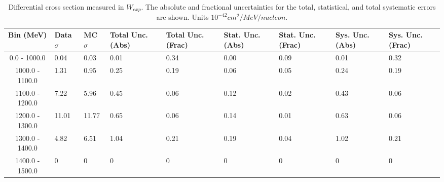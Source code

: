 \begin{table}[!htb]
    \centering
    \tiny
    \begin{tabular}{|c|p{0.5in}|p{0.5in}|p{0.5in}|p{0.5in}|p{0.5in}|p{0.5in}|p{0.5in}|p{0.5in}|}
        \hline
        Bin (MeV)& Data $\sigma$ & MC $\sigma$ & Total Unc. (Abs) & Total Unc. (Frac)  & Stat. Unc. (Abs) & Stat. Unc. (Frac) & Sys. Unc. (Abs) & Sys. Unc. (Frac)\\ \hline
0.0 - 1000.0 & 0.04 & 0.03 & 0.01 & 0.34 & 0.00 & 0.09 & 0.01 & 0.32\\ \hline
1000.0 - 1100.0 & 1.31 & 0.95 & 0.25 & 0.19 & 0.06 & 0.05 & 0.24 & 0.19\\ \hline
1100.0 - 1200.0 & 7.22 & 5.96 & 0.45 & 0.06 & 0.12 & 0.02 & 0.43 & 0.06\\ \hline
1200.0 - 1300.0 & 11.01 & 11.77 & 0.65 & 0.06 & 0.14 & 0.01 & 0.63 & 0.06\\ \hline
1300.0 - 1400.0 & 4.82 & 6.51 & 1.04 & 0.21 & 0.19 & 0.04 & 1.02 & 0.21\\ \hline
1400.0 - 1500.0 & 0 & 0 & 0 & 0 & 0 & 0 & 0 & 0\\ \hline

    \end{tabular}
    \caption{Differential cross section measured in $W_{exp}$. The absolute and fractional uncertainties for the total, statistical, and total systematic errors are shown. Units $10^{-42}cm^2/MeV/nucleon$.}
    \label{tab:ApdxA:XSecTable1Dwexp}
\end{table}





















